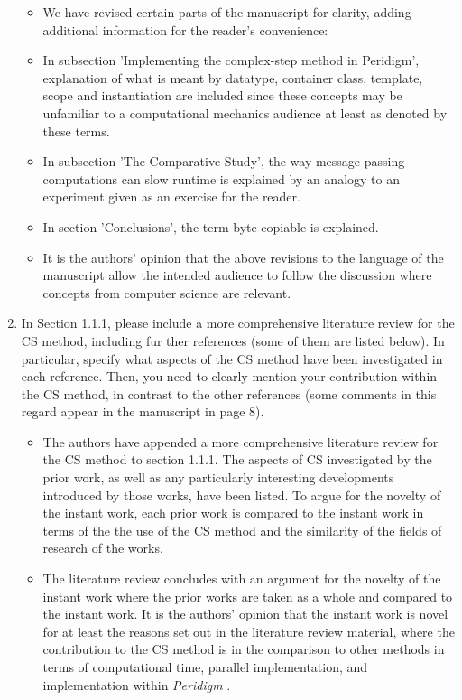 \documentclass{article}
\begin{document}
\begin{enumerate}
{\color{red}
  \begin{itemize}
    \item 
        We have revised certain parts of the manuscript for clarity, adding additional information for the reader's
        convenience:
    \item
        In subsection 'Implementing the complex-step method in Peridigm', explanation of what is meant by datatype,
        container class, template, scope and instantiation are included since these concepts may be unfamiliar to
        a computational mechanics audience at least as denoted by these terms. 
    \item 
        In subsection 'The Comparative Study', the way message passing computations can slow runtime is explained
        by an analogy to an experiment given as an exercise for the reader. 
    \item 
        In section 'Conclusions', the term byte-copiable is explained. 
    \item 
        It is the authors' opinion that the above revisions to the language of the manuscript allow the intended audience
        to follow the discussion where concepts from computer science are relevant.
  \end{itemize}}

  \item
     In Section 1.1.1, please include a more comprehensive literature review for
     the CS method, including fur ther references (some of them are listed below).
     In particular, specify what aspects of the CS method have been investigated in
     each reference. Then, you need to clearly mention your contribution within
     the CS method, in contrast to the other references (some comments in this
     regard appear in the manuscript in page 8).

{\color{red}
  \begin{itemize}
     \item 
         The authors have appended a more comprehensive literature review for the CS method to section 1.1.1.
         The aspects of CS investigated by the prior work, as well as any particularly interesting
         developments introduced by those works, have been listed. To argue for the novelty of the instant work,
         each prior work is compared to the instant work in terms of the the use of the CS method and the similarity of the fields of research of the works.
     \item
         The literature review concludes with an argument for the novelty of the instant
         work where the prior works are taken as a whole and compared to the instant work. It is the authors' opinion
         that the instant work is novel for at least the reasons set out in the literature review material, where
         the contribution to the CS method is in the comparison to other methods in terms of computational
         time,  parallel implementation, and implementation within \emph{Peridigm} .
  \end{itemize}}



\end{enumerate}
\end{document}
